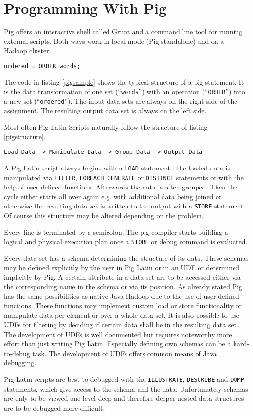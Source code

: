 \section{Programming With Pig}

Pig offers an interactive shell called Grunt and a command line tool for running external scripts. Both ways work in local mode (Pig standalone) and on a Hadoop cluster.

\begin{lstlisting}[language=pig,caption=A typical Pig line of code,label=pigsample]
ordered = ORDER words;
\end{lstlisting} 

The code in listing \ref{pigsample} shows the typical structure of a pig statement. It is the data transformation of one set (``{\tt words}'') with an operation (``{\tt ORDER}'') into a new set (``{\tt ordered}''). The input data sets are always on the right side of the assignment. The resulting output data set is always on the left side.

Most often Pig Latin Scripts naturally follow the structure of listing \ref{pigstructure}.

\begin{lstlisting}[language=jaql,caption=Pig Latin Script Structure ,label=pigstructure]
Load Data -> Manipulate Data -> Group Data -> Output Data
\end{lstlisting}
                                                       
A Pig Latin script always begins with a {\tt LOAD} statement. The loaded data is manipulated via {\tt FILTER}, {\tt FOREACH GENERATE} or {\tt DISTINCT} statements or with the help of user-defined functions. Afterwards the data is often grouped. Then the cycle either starts all over again e.g. with additional data being joined or otherwise the resulting data set is written to the output with a {\tt STORE} statement. Of course this structure may be altered depending on the problem.     

Every line is terminated by a semicolon. The pig compiler starts building a logical and physical execution plan once a {\tt STORE} or debug command is evaluated.
                   
Every data set has a schema determining the structure of its data. These schemas may be defined explicitly by the user in Pig Latin or in an UDF or determined implicitly by Pig. A certain attribute in a data set are to be accessed either via the corresponding name in the schema or via its position.
As already stated Pig has the same possibilities as native Java Hadoop due to the use of user-defined functions. These functions may implement custom load or store functionality or manipulate data per element or over a whole data set. It is also possible to use UDFs for filtering by deciding if certain data shall be in the resulting data set.
The development of UDFs is well documented but requires noteworthy more effort than just writing Pig Latin. Especially defining own schemas can be a hard-to-debug task. The development of UDFs offers common means of Java debugging.

Pig Latin scripts are best to debugged with the {\tt ILLUSTRATE}, {\tt DESCRIBE} and {\tt DUMP} statements, which give access to the schema and the data. Unfortunately schemas are only to be viewed one level deep and therefore deeper nested data structures are to be debugged more difficult.